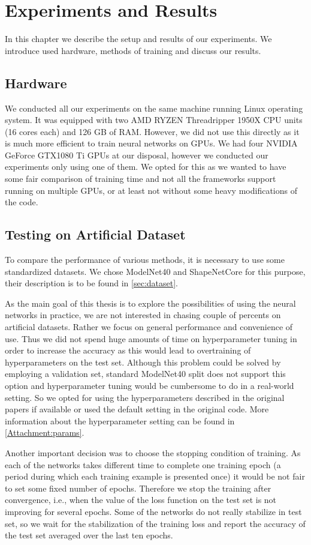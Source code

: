 \chapter{Experiments and Results}
\label{sec:chap5}
In this chapter we describe the setup and results of our experiments. We introduce used hardware, methods of training and discuss our results.

\section{Hardware}
We conducted all our experiments on the same machine running Linux operating system. It was equipped with two AMD RYZEN Threadripper 1950X CPU units (16 cores each) and 126 GB of RAM. However, we did not use this directly as it is much more efficient to train neural networks on GPUs. We had four NVIDIA GeForce GTX1080 Ti GPUs at our disposal, however we conducted our experiments only using one of them. We opted for this as we wanted to have some fair comparison of training time and not all the frameworks support running on multiple GPUs, or at least not without some heavy modifications of the code. 

\section{Testing on Artificial Dataset}
To compare the performance of various methods, it is necessary to use some standardized datasets. We chose ModelNet40 and ShapeNetCore for this purpose, their description is to be found in \autoref{sec:dataset}. \par
As the main goal of this thesis is to explore the possibilities of using the neural networks in practice, we are not interested in chasing couple of percents on artificial datasets. Rather we focus on general performance and convenience of use. Thus we did not spend huge amounts of time on hyperparameter tuning in order to increase the accuracy as this would lead to overtraining of hyperparameters on the test set. Although this problem could be solved by employing a validation set, standard ModelNet40 split does not support this option and hyperparameter tuning would be cumbersome to do in a real-world setting. So we opted for using the hyperparameters described in the original papers if available or used the default setting in the original code. More information about the hyperparameter setting can be found in \autoref{Attachment:params}. \par
Another important decision was to choose the stopping condition of training. As each of the networks takes different time to complete one training epoch (a period during which each training example is presented once) it would be not fair to set some fixed number of epochs. Therefore we stop the training after convergence, i.e., when the value of the loss function on the test set is not improving for several epochs. Some of the networks do not really stabilize in test set, so we wait for the stabilization of the training loss and report the accuracy of the test set averaged over the last ten epochs.

